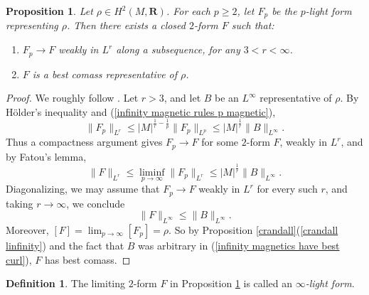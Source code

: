 \documentclass[reqno,11pt]{amsart}
\newcommand{\RR}{\mathbf{R}}
\newcommand{\dfn}[1]{\emph{#1}\index{#1}}
\newtheorem{proposition}[theorem]{Proposition}
\theoremstyle{definition}
\newtheorem{definition}[theorem]{Definition}
\numberwithin{equation}{section}
\begin{document}
\begin{proposition}\label{existence infinity}
Let $\rho \in H^2(M, \RR)$.
For each $p \geq 2$, let $F_p$ be the $p$-light form representing $\rho$. Then there exists a closed $2$-form $F$ such that:
\begin{enumerate}
\item $F_p \to F$ weakly in $L^r$ along a subsequence, for any $3 < r < \infty$.
\item $F$ is a best comass representative of $\rho$.
\end{enumerate}
\end{proposition}
\begin{proof}
We roughly follow \cite[\S3]{Lindqvist14}.
Let $r > 3$, and let $B$ be an $L^\infty$ representative of $\rho$.
By H\"older's inequality and (\ref{infinity magnetic rules p magnetic}),
\begin{equation}\label{uniform bounds in p by best curl}
	\|F_p\|_{L^r} \leq |M|^{\frac{1}{r} - \frac{1}{p}} \|F_p\|_{L^p} \leq |M|^{\frac{1}{r}} \|B\|_{L^\infty}.
\end{equation}
Thus a compactness argument gives $F_p \to F$ for some $2$-form $F$, weakly in $L^r$, and by Fatou's lemma, 
$$\|F\|_{L^r} \leq \liminf_{p \to \infty} \|F_p\|_{L^r} \leq |M|^{\frac{1}{r}} \|B\|_{L^\infty}.$$
Diagonalizing, we may assume that $F_p \to F$ weakly in $L^r$ for every such $r$, and taking $r \to \infty$, we conclude 
\begin{equation}\label{infinity magnetics have best curl}
	\|F\|_{L^\infty} \leq \|B\|_{L^\infty}.
\end{equation}
Moreover, $[F] = \lim_{p \to \infty} [F_p] = \rho$.
So by Proposition \ref{crandall}(\ref{crandall linfinity}) and the fact that $B$ was arbitrary in (\ref{infinity magnetics have best curl}), $F$ has best comass.
\end{proof}

\begin{definition}
The limiting $2$-form $F$ in Proposition \ref{existence infinity} is called an \dfn{$\infty$-light form}.
\end{definition}


\end{document}
